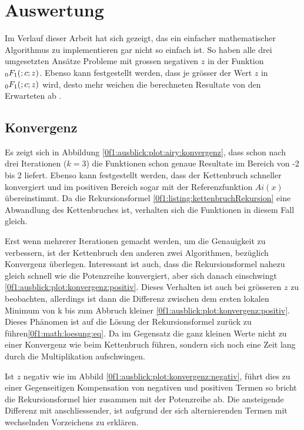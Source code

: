 %
%
%
\section{Auswertung
\label{0f1:section:teil3}}
Im Verlauf dieser Arbeit hat sich gezeigt, 
das ein einfacher mathematischer Algorithmus zu implementieren gar nicht so einfach ist.
So haben alle drei umgesetzten Ansätze Probleme mit grossen negativen $z$ in der Funktion $\mathstrut_0F_1(;c;z)$.
Ebenso kann festgestellt werden, dass je grösser der Wert $z$ in $\mathstrut_0F_1(;c;z)$ wird, desto mehr weichen die berechneten Resultate von den Erwarteten ab \cite{0f1:wolfram-0f1}.

\subsection{Konvergenz
\label{0f1:subsection:konvergenz}}
Es zeigt sich in Abbildung \ref{0f1:ausblick:plot:airy:konvergenz}, dass schon nach drei Iterationen ($k = 3$) die Funktionen schon genaue Resultate im Bereich von -2 bis 2 liefert. Ebenso kann festgestellt werden, dass der Kettenbruch schneller konvergiert und im positiven Bereich sogar mit der Referenzfunktion $Ai(x)$ übereinstimmt. Da die Rekursionsformel \ref{0f1:listing:kettenbruchRekursion} eine Abwandlung des Kettenbruches ist, verhalten sich die Funktionen in diesem Fall gleich.

Erst wenn mehrerer Iterationen gemacht werden, um die Genauigkeit zu verbessern, ist der Kettenbruch den anderen zwei Algorithmen, bezüglich Konvergenz überlegen. 
Interessant ist auch, dass die Rekursionsformel nahezu gleich schnell wie die Potenzreihe konvergiert, aber sich danach einschwingt \ref{0f1:ausblick:plot:konvergenz:positiv}. Dieses Verhalten ist auch bei grösseren $z$ zu beobachten, allerdings ist dann die Differenz zwischen dem ersten lokalen Minimum von k bis zum Abbruch kleiner
\ref{0f1:ausblick:plot:konvergenz:positiv}.
Dieses Phänomen ist auf die Lösung der Rekursionsformel zurück zu führen\eqref{0f1:math:loesung:eq}. Da im Gegensatz die ganz kleinen Werte nicht zu einer Konvergenz wie beim Kettenbruch führen, sondern sich noch eine Zeit lang durch die Multiplikation aufschwingen.

Ist $z$ negativ wie im Abbild \ref{0f1:ausblick:plot:konvergenz:negativ}, führt dies zu einer Gegenseitigen Kompensation von negativen und positiven Termen so bricht die Rekursionsformel hier zusammen mit der Potenzreihe ab.
Die ansteigende Differenz mit anschliessender, ist aufgrund der sich alternierenden Termen mit wechselnden Vorzeichens zu erklären.

